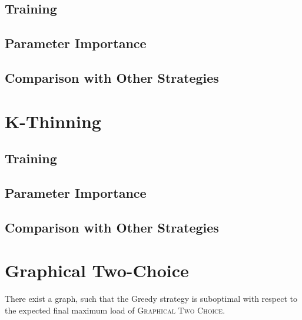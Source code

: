 

\subsection{Training}


\subsection{Parameter Importance}


\subsection{Comparison with Other Strategies}



\section{K-Thinning}


\subsection{Training}


\subsection{Parameter Importance}


\subsection{Comparison with Other Strategies}


\section{Graphical Two-Choice}


\begin{lemma} \label{lemma: greedy-suboptimal}
There exist a graph, such that the Greedy strategy is suboptimal with respect to the expected final maximum load of \textsc{Graphical Two Choice}.
\end{lemma}

